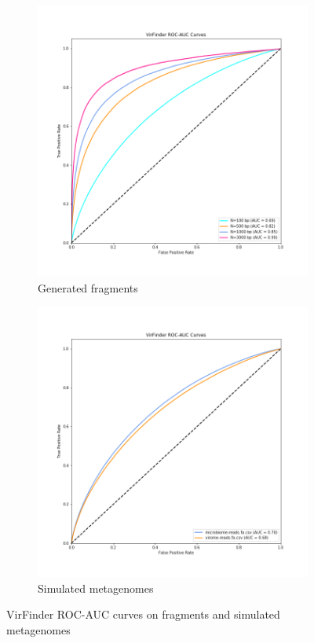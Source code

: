 \documentclass[conference]{IEEEtran}
\begin{document}
\begin{figure}
	\centering
\begin{subfigure}{0.5\textwidth}
	\includegraphics[width=\linewidth]{imgs/roc_auc.png}
	\caption{Generated fragments} 
	\label{fig:roc_auc_virfindera}
\end{subfigure}
\begin{subfigure}{0.5\textwidth}
	\includegraphics[width=\linewidth]{imgs/roc_auc_simulated.png}
	\caption{Simulated metagenomes} 
	\label{fig:roc_auc_virfinderb}
\end{subfigure}
\caption{VirFinder ROC-AUC curves on fragments and simulated metagenomes} 
\label{fig:roc_auc_virfinder}
\end{figure}
\end{document}
